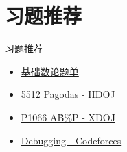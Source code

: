 \section{习题推荐}
\begin{frame}[fragile]{习题推荐}
  \begin{itemize}
    \item \href{https://www.luogu.com.cn/training/83157#problems}{基础数论题单}
    \item \href{https://acm.dingbacode.com/showproblem.php?pid=5512}{5512 Pagodas - HDOJ}
    \item \href{https://acm.xidian.edu.cn/problem.php?id=1066}{P1066 A\^B\%P - XDOJ}
    \item \href{https://codeforces.com/gym/101485/attachments}{Debugging - Codeforces}
  \end{itemize}
\end{frame}
